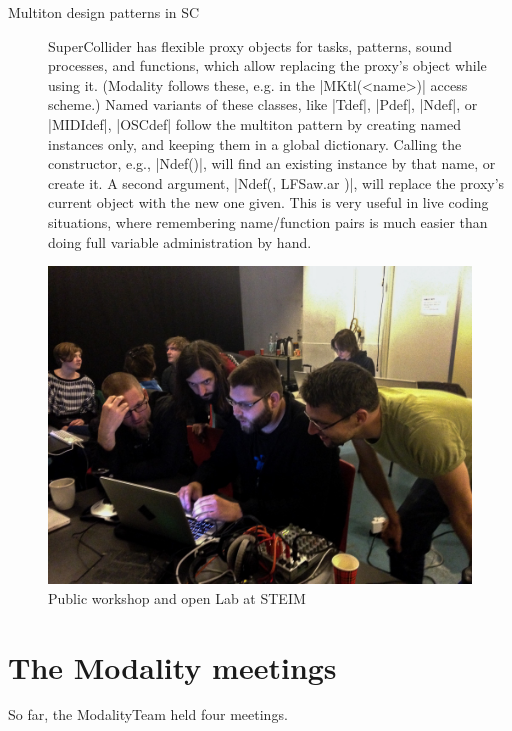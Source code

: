 \documentclass{article}
\begin{document}
\begin{description}
	\item[Multiton design patterns in SC] 
		SuperCollider has flexible proxy objects for tasks, patterns, sound processes, and functions, which allow replacing the proxy's object while using it. (Modality follows these, e.g. in the |MKtl(<name>)| access scheme.)
		Named variants of these classes, like |Tdef|, |Pdef|, |Ndef|, or |MIDIdef|, |OSCdef| follow the multiton pattern by creating named instances only, and keeping them in a global dictionary. 
		Calling the constructor, e.g., |Ndef(\a)|, will find an existing instance by that name, or create it. 
		A second argument, |Ndef(\a, { LFSaw.ar })|, will replace the proxy's current object with the new one given. This is very useful in live coding situations, where remembering name/function pairs is much easier than doing full  variable administration by hand.
\end{description}


\begin{figure}[h]
	\centering
		\includegraphics[width=.9\columnwidth]{../media/20140403-IMG_1667.jpg}
	\caption{Public workshop and open Lab at STEIM}
	\label{fig:media_20140403-IMG_1667}
\end{figure}




\section{The Modality meetings}
\label{sec:the_modality_meetings}

So far, the ModalityTeam held four meetings.
\end{document}
